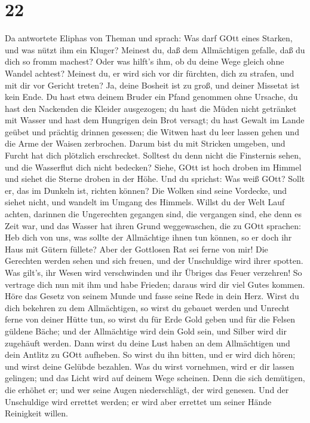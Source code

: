 \hypertarget{section-21}{%
\section{22}\label{section-21}}

 Da antwortete Eliphas von Theman und sprach: 
Was darf GOtt eines Starken, und was nützt ihm ein Kluger? 
Meinest du, daß dem Allmächtigen gefalle, daß du dich so fromm machest?
Oder was hilft's ihm, ob du deine Wege gleich ohne Wandel achtest?
 Meinest du, er wird sich vor dir fürchten, dich zu strafen,
und mit dir vor Gericht treten?  Ja, deine Bosheit ist zu
groß, und deiner Missetat ist kein Ende.  Du hast etwa
deinem Bruder ein Pfand genommen ohne Ursache, du hast den Nackenden die
Kleider ausgezogen;  du hast die Müden nicht getränket mit
Wasser und hast dem Hungrigen dein Brot versagt;  du hast
Gewalt im Lande geübet und prächtig drinnen gesessen;  die
Witwen hast du leer lassen gehen und die Arme der Waisen zerbrochen.
 Darum bist du mit Stricken umgeben, und Furcht hat dich
plötzlich erschrecket.  Solltest du denn nicht die
Finsternis sehen, und die Wasserflut dich nicht bedecken? 
Siehe, GOtt ist hoch droben im Himmel und siehet die Sterne droben in
der Höhe.  Und du sprichst: Was weiß GOtt? Sollt er, das im
Dunkeln ist, richten können?  Die Wolken sind seine
Vordecke, und siehet nicht, und wandelt im Umgang des Himmels.
 Willst du der Welt Lauf achten, darinnen die Ungerechten
gegangen sind,  die vergangen sind, ehe denn es Zeit war,
und das Wasser hat ihren Grund weggewaschen,  die zu GOtt
sprachen: Heb dich von uns, was sollte der Allmächtige ihnen tun können,
 so er doch ihr Haus mit Gütern füllete? Aber der Gottlosen
Rat sei ferne von mir!  Die Gerechten werden sehen und sich
freuen, und der Unschuldige wird ihrer spotten.  Was
gilt's, ihr Wesen wird verschwinden und ihr Übriges das Feuer verzehren!
 So vertrage dich nun mit ihm und habe Frieden; daraus wird
dir viel Gutes kommen.  Höre das Gesetz von seinem Munde
und fasse seine Rede in dein Herz.  Wirst du dich bekehren
zu dem Allmächtigen, so wirst du gebauet werden und Unrecht ferne von
deiner Hütte tun,  so wirst du für Erde Gold geben und für
die Felsen güldene Bäche;  und der Allmächtige wird dein
Gold sein, und Silber wird dir zugehäuft werden.  Dann
wirst du deine Lust haben an dem Allmächtigen und dein Antlitz zu GOtt
aufheben.  So wirst du ihn bitten, und er wird dich hören;
und wirst deine Gelübde bezahlen.  Was du wirst vornehmen,
wird er dir lassen gelingen; und das Licht wird auf deinem Wege
scheinen.  Denn die sich demütigen, die erhöhet er; und wer
seine Augen niederschlägt, der wird genesen.  Und der
Unschuldige wird errettet werden; er wird aber errettet um seiner Hände
Reinigkeit willen.

